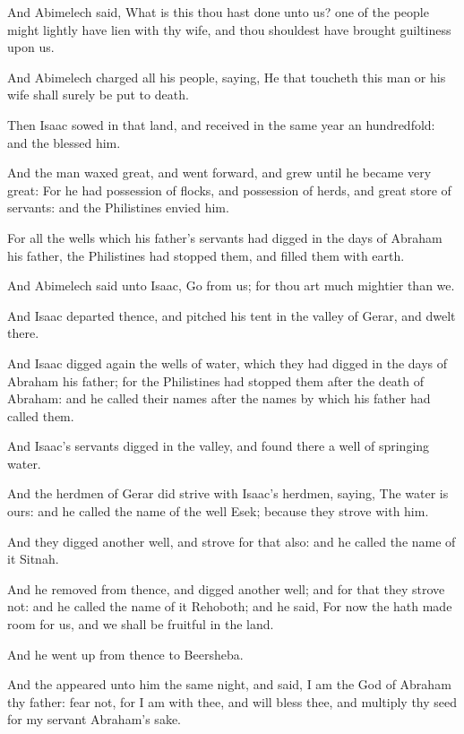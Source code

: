 \verse And Abimelech said, What is this thou hast done unto us? one of the people might lightly have lien with thy wife, and thou shouldest have brought guiltiness upon us.

\verse And Abimelech charged all his people, saying, He that toucheth this man or his wife shall surely be put to death.

\verse Then Isaac sowed in that land, and received in the same year an hundredfold: and the \LORD blessed him.

\verse And the man waxed great, and went forward, and grew until he became very great: \verse For he had possession of flocks, and possession of herds, and great store of servants: and the Philistines envied him.

\verse For all the wells which his father's servants had digged in the days of Abraham his father, the Philistines had stopped them, and filled them with earth.

\verse And Abimelech said unto Isaac, Go from us; for thou art much mightier than we.

\verse And Isaac departed thence, and pitched his tent in the valley of Gerar, and dwelt there.

\verse And Isaac digged again the wells of water, which they had digged in the days of Abraham his father; for the Philistines had stopped them after the death of Abraham: and he called their names after the names by which his father had called them.

\verse And Isaac's servants digged in the valley, and found there a well of springing water.

\verse And the herdmen of Gerar did strive with Isaac's herdmen, saying, The water is ours: and he called the name of the well Esek; because they strove with him.

\verse And they digged another well, and strove for that also: and he called the name of it Sitnah.

\verse And he removed from thence, and digged another well; and for that they strove not: and he called the name of it Rehoboth; and he said, For now the \LORD hath made room for us, and we shall be fruitful in the land.

\verse And he went up from thence to Beersheba.

\verse And the \LORD appeared unto him the same night, and said, I am the God of Abraham thy father: fear not, for I am with thee, and will bless thee, and multiply thy seed for my servant Abraham's sake.

